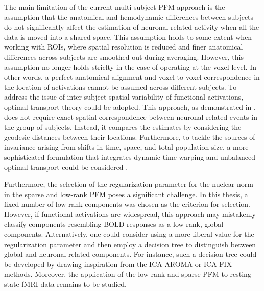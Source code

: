 The main limitation of the current multi-subject PFM approach is the assumption
that the anatomical and hemodynamic differences between subjects do not
significantly affect the estimation of neuronal-related activity when all the
data is moved into a shared space. This assumption holds to some extent when
working with ROIs, where spatial resolution is reduced and finer anatomical
differences across subjects are smoothed out during averaging. However, this
assumption no longer holds striclty in the case of operating at the voxel level.
In other words, a perfect anatomical alignment and voxel-to-voxel correspondence
in the location of activations cannot be assumed across different subjects. To
address the issue of inter-subject spatial variability of functional
activations, optimal transport theory could be adopted. This approach, as
demonstrated in
\citep{Gramfort2015FastOptimalTransport,Janati2019Wassersteinregularizationsparse,Janati2020MultisubjectMEG/EEG},
does not require exact spatial correspondence between neuronal-related events in
the group of subjects. Instead, it compares the estimates by considering the
geodesic distances between their locations. Furthermore, to tackle the sources
of invariance arising from shifts in time, space, and total population size, a
more sophisticated formulation that integrates dynamic time warping and
unbalanced optimal transport could be considered
\citep{Janati2022AveragingSpatiotemporal}.

Furthermore, the selection of the regularization parameter for the nuclear norm
in the sparse and low-rank PFM poses a significant challenge. In this thesis, a
fixed number of low rank components was chosen as the criterion for selection.
However, if functional activations are widespread, this approach may mistakenly
classify components resembling BOLD responses as a low-rank, global components.
Alternatively, one could consider using a more liberal value for the
regularization parameter and then employ a decision tree to distinguish between
global and neuronal-related components. For instance, such a decision tree could
be developed by drawing inspiration from the ICA AROMA
\citep{Pruim2015ICAAROMArobust} or ICA FIX
\citep{SalimiKhorshidi2014Automaticdenoisingfunctional} methods. Moreover, the
application of the low-rank and sparse PFM to resting-state fMRI data remains to
be studied.

